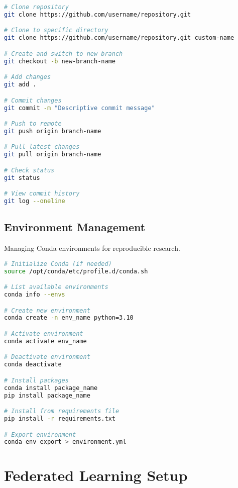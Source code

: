 \documentclass{article}
\begin{document}
\begin{tcolorbox}[colback=purple!5!white, colframe=purple!75!black, title=Git Workflow Commands]
\begin{lstlisting}[language=bash]
# Clone repository
git clone https://github.com/username/repository.git

# Clone to specific directory
git clone https://github.com/username/repository.git custom-name

# Create and switch to new branch
git checkout -b new-branch-name

# Add changes
git add .

# Commit changes
git commit -m "Descriptive commit message"

# Push to remote
git push origin branch-name

# Pull latest changes
git pull origin branch-name

# Check status
git status

# View commit history
git log --oneline
\end{lstlisting}
\end{tcolorbox}

\subsection{Environment Management}
Managing Conda environments for reproducible research.

\begin{tcolorbox}[colback=purple!5!white, colframe=purple!75!black, title=Conda Environment Commands]
\begin{lstlisting}[language=bash]
# Initialize Conda (if needed)
source /opt/conda/etc/profile.d/conda.sh

# List available environments
conda info --envs

# Create new environment
conda create -n env_name python=3.10

# Activate environment
conda activate env_name

# Deactivate environment
conda deactivate

# Install packages
conda install package_name
pip install package_name

# Install from requirements file
pip install -r requirements.txt

# Export environment
conda env export > environment.yml
\end{lstlisting}
\end{tcolorbox}

\section{Federated Learning Setup}
\end{document}
